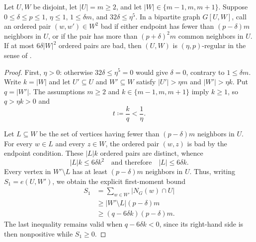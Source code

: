 \begin{lemma}
Let $U,W$ be disjoint, let $|U|=m\geq2$, and let $|W|\in\{m-1,m,m+1\}$.  Suppose $0\leq\delta\leq p\leq1$, $\eta\leq1$, $1\leq\delta m$, and $32\delta\leq\eta^5$.  In a bipartite graph $G[U,W]$, call an ordered pair $(w,w')\in W^2$ bad if either endpoint has fewer than $(p-\delta)m$ neighbors in $U$, or if the pair has more than $(p+\delta)^2m$ common neighbors in $U$.  If at most $6\delta|W|^2$ ordered pairs are bad, then $(U,W)$ is $(\eta,p)$-regular in the sense of .
\end{lemma}
\begin{proof}
First, $\eta>0$: otherwise $32\delta\leq\eta^5=0$ would give
$\delta=0$, contrary to $1\leq\delta m$.  Write $k=|W|$ and let
$U'\subseteq U$ and $W'\subseteq W$ satisfy $|U'|>\eta m$ and
$|W'|>\eta k$.  Put $q=|W'|$.  The assumptions $m\geq2$ and
$k\in\{m-1,m,m+1\}$ imply $k\geq1$, so $q>\eta k>0$ and
\begin{equation}\label{eq:near-equal-ratio}
 t\coloneqq \frac{k}{q}<\frac1\eta.
\end{equation}

Let $L\subseteq W$ be the set of vertices having fewer than
$(p-\delta)m$ neighbors in $U$.  For every $w\in L$ and every $z\in W$,
the ordered pair $(w,z)$ is bad by the endpoint condition.  These
$|L|k$ ordered pairs are distinct, whence
\[
 |L|k\leq 6\delta k^2
 \quad\text{and therefore}\quad |L|\leq6\delta k.
\]
Every vertex in $W'\setminus L$ has at least $(p-\delta)m$ neighbors in
$U$.  Thus, writing $S_1=e(U,W')$, we obtain the explicit first-moment
bound
\begin{align*}
 S_1
 &=\sum_{w\in W'}|N_G(w)\cap U|\\
 &\geq |W'\setminus L|(p-\delta)m\\
 &\geq (q-6\delta k)(p-\delta)m.
\end{align*}
The last inequality remains valid when $q-6\delta k<0$, since its
right-hand side is then nonpositive while $S_1\geq0$.


\end{proof}
